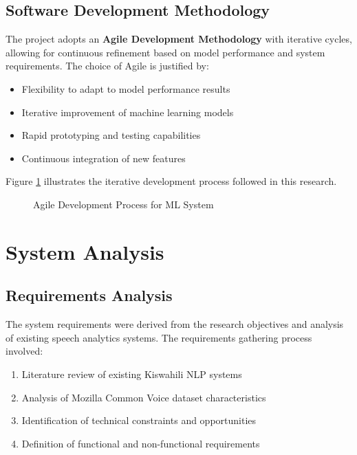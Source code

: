 \documentclass[12pt,a4paper]{report}
\begin{document}
\subsection{Software Development Methodology}
The project adopts an \textbf{Agile Development Methodology} with iterative cycles, allowing for continuous refinement based on model performance and system requirements. The choice of Agile is justified by:

\begin{itemize}
    \item Flexibility to adapt to model performance results
    \item Iterative improvement of machine learning models
    \item Rapid prototyping and testing capabilities
    \item Continuous integration of new features
\end{itemize}

Figure \ref{fig:agile_process} illustrates the iterative development process followed in this research.

\begin{figure}[H]
    \centering
    
    \caption{Agile Development Process for ML System}
    \label{fig:agile_process}
\end{figure}

\section{System Analysis}
\subsection{Requirements Analysis}
The system requirements were derived from the research objectives and analysis of existing speech analytics systems. The requirements gathering process involved:

\begin{enumerate}
    \item Literature review of existing Kiswahili NLP systems
    \item Analysis of Mozilla Common Voice dataset characteristics
    \item Identification of technical constraints and opportunities
    \item Definition of functional and non-functional requirements
\end{enumerate}
\end{document}
